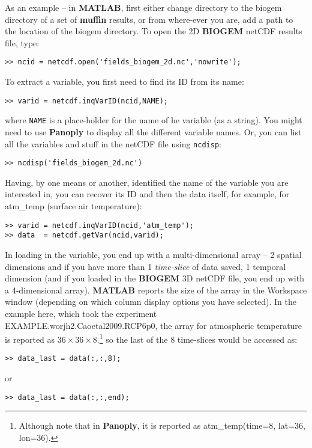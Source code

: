 \documentclass[11pt,fleqn]{book} %
\begin{document}
As an example -- in \textbf{MATLAB}, first either change directory to the \textsf{\small biogem} directory of a set of \textbf{muffin} results, or from where-ever you are, add a path to the location of the \textsf{\small biogem} directory. To open the 2D \textbf{BIOGEM} netCDF results file, type:
\begin{verbatim}
>> ncid = netcdf.open('fields_biogem_2d.nc','nowrite');
\end{verbatim}

To extract a variable, you first need to find its ID from its name:
\begin{verbatim}
>> varid = netcdf.inqVarID(ncid,NAME);
\end{verbatim}
where \texttt{NAME} is a place-holder for the name of he variable (as a string). You might need to use \textbf{Panoply} to display all the different variable names. Or, you can list all the variables and stuff in the netCDF file using \texttt{ncdisp}:
\begin{verbatim}
>> ncdisp('fields_biogem_2d.nc') 
\end{verbatim}

Having, by one means or another, identified the name of the variable you are interested in, you can recover its ID and then the data itself, for example, for \textsf{\footnotesize atm\_temp} (\textsf{\footnotesize surface air temperature}):
\begin{verbatim}
>> varid = netcdf.inqVarID(ncid,'atm_temp');
>> data  = netcdf.getVar(ncid,varid);
\end{verbatim}

In loading in the variable, you end up with a multi-dimensional array -- 2 spatial dimensions and if you have more than 1 \textit{time-slice} of data saved, 1 temporal dimension (and if you loaded in the \textbf{BIOGEM} 3D netCDF file, you end up with a 4-dimensional array). \textbf{MATLAB} reports the size of the array in the \textsf{\footnotesize Workspace window} (depending on which column display options you have selected). In the example here, which took the experiment \textsf{\footnotesize EXAMPLE.worjh2.Caoetal2009.RCP6p0}, the array for atmospheric temperature is reported as \(36\times36\times8\).\footnote{Although note that in \textbf{Panoply}, it is reported as \textsf{\scriptsize atm\_temp(time=8, lat=36, lon=36)}.} so the last of the 8 time-slices would  be accessed as:
\begin{verbatim}
>> data_last = data(:,:,8);
\end{verbatim}
or
\begin{verbatim}
>> data_last = data(:,:,end);
\end{verbatim}
\end{document}
